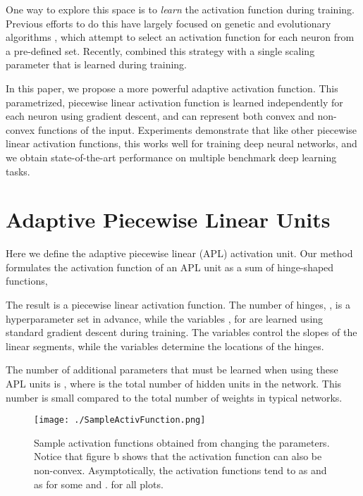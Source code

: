 \documentclass{article} \usepackage{iclr2015,times}
\begin{document}
One way to explore this space is to \emph{learn} the activation function during training. Previous efforts to do this have largely focused on genetic and evolutionary algorithms \citep{yao1999evolving}, which attempt to select an activation function for each neuron from a pre-defined set. Recently, \citet{turner2014neuroevolution} combined this strategy with a single scaling parameter that is learned during training.

In this paper, we propose a more powerful adaptive activation function. This parametrized, piecewise linear activation function is learned independently for each neuron using gradient descent, and can represent both convex and non-convex functions of the input. Experiments demonstrate that like other piecewise linear activation functions, this works well for training deep neural networks, and we obtain state-of-the-art performance on multiple benchmark deep learning tasks.


 


\section{Adaptive Piecewise Linear Units}
\label{sec:learnedfunctions}



Here we define the adaptive piecewise linear (APL) activation unit. Our method formulates the activation function  of an APL unit  as a sum of hinge-shaped functions,

The result is a piecewise linear activation function. The number of hinges, , is a hyperparameter set in advance, while the variables ,   for  are learned using standard gradient descent during training. The    variables control the slopes of the linear segments, while the  variables determine the locations of the hinges.

The number of additional parameters that must be learned when using these APL units is , where  is the total number of hidden units in the network. This number is small compared to the total number of weights in typical networks.

\begin{wrapfigure}{r}{0.5\textwidth}
\center
\vspace{-0.5in}
\texttt{[image: ./SampleActivFunction.png]}
\caption{Sample activation functions obtained from changing the parameters. Notice that figure b shows that the activation function can also be non-convex.
Asymptotically, the activation functions tend to  as  and  as  for some  and .
 for all plots.
\vspace{-0.5in}
}
\label{fig:SampleActivFunction}
\end{wrapfigure}
\end{document}
